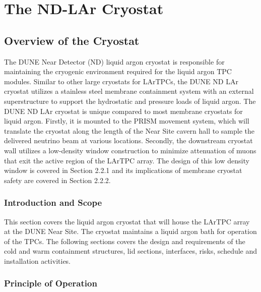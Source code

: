 \chapter{The ND-LAr Cryostat}
\label{ch:cryostat}


\section{Overview of the Cryostat}
\label{sec:cryost-ovvw}
The DUNE Near Detector (ND) liquid argon cryostat is responsible for maintaining the cryogenic environment required for the liquid argon TPC modules.  Similar to other large cryostats for LArTPCs, the DUNE ND LAr cryostat utilizes a stainless steel membrane containment system with an external superstructure to support the hydrostatic and pressure loads of liquid argon.
The DUNE ND LAr cryostat is unique compared to most membrane cryostats for liquid argon.  Firstly, it is mounted to the PRISM movement system, which will translate the cryostat along the length of the Near Site cavern hall to sample the delivered neutrino beam at various locations.  Secondly, the downstream cryostat wall utilizes a low-density window construction to minimize attenuation of muons that exit the active region of the LArTPC array.  The design of this low density window is covered in Section 2.2.1 and its implications of membrane cryostat safety are covered in Section 2.2.2.



\subsection{Introduction and Scope}
\label{sec:cryost-ovvw-intro}
This section covers the liquid argon cryostat that will house the LArTPC array at the DUNE Near Site.  The cryostat maintains a liquid argon bath for operation of the TPCs.  The following sections covers the design and requirements of the cold and warm containment structures, lid sections, interfaces, risks, schedule and installation activities.


\subsection{Principle of Operation}
\label{sec:cryost-ovvw-op}


